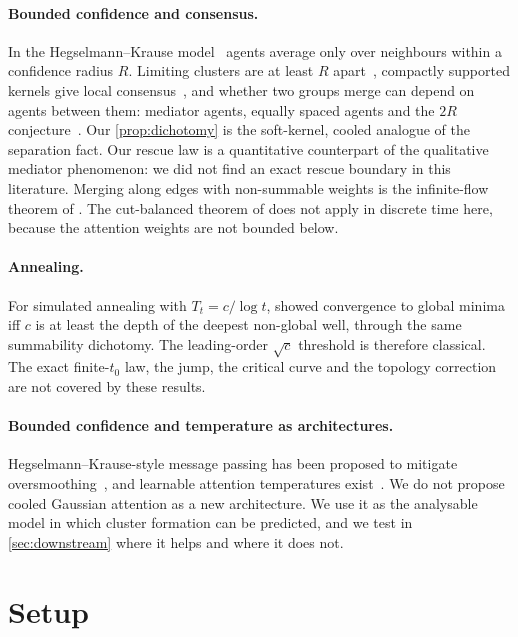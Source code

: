 \documentclass[10pt]{article}
\theoremstyle{definition}
\theoremstyle{remark}
\begin{document}
\paragraph{Bounded confidence and consensus.}
In the Hegselmann--Krause model~\citep{hegselmann2002} agents average only over neighbours within a confidence radius $R$.
Limiting clusters are at least $R$ apart~\citep{blondel2009}, compactly supported kernels give local
consensus~\citep{jabin2014,motsch2014}, and whether two groups merge can depend on agents between them: mediator agents, equally
spaced agents and the $2R$ conjecture~\citep{slanina2011,hegarty2014,wang2017}. Our \cref{prop:dichotomy} is the soft-kernel,
cooled analogue of the separation fact. Our rescue law is a quantitative counterpart of the qualitative mediator phenomenon: we
did not find an exact rescue boundary in this literature. Merging along edges with non-summable weights is the infinite-flow
theorem of \citet{touri2014}. The cut-balanced theorem of \citet{hendrickx2013} does not apply in discrete time here, because the
attention weights are not bounded below.

\paragraph{Annealing.}
For simulated annealing with $T_t=c/\log t$, \citet{hajek1988} showed convergence to global minima iff $c$ is at least the depth of the
deepest non-global well, through the same summability dichotomy. The leading-order $\sqrt c$ threshold is therefore classical. The
exact finite-$t_0$ law, the jump, the critical curve and the topology correction are not covered by these results.

\paragraph{Bounded confidence and temperature as architectures.}
Hegselmann--Krause-style message passing has been proposed to mitigate oversmoothing~\citep{zhou2026odnet,wang2025bimp}, and learnable
attention temperatures exist~\citep{ma2026gated}. We do not propose cooled Gaussian attention as a new architecture. We use it as the
analysable model in which cluster formation can be predicted, and we test in \cref{sec:downstream} where it helps and where it does not.

\section{Setup}\label{sec:setup}
\end{document}
